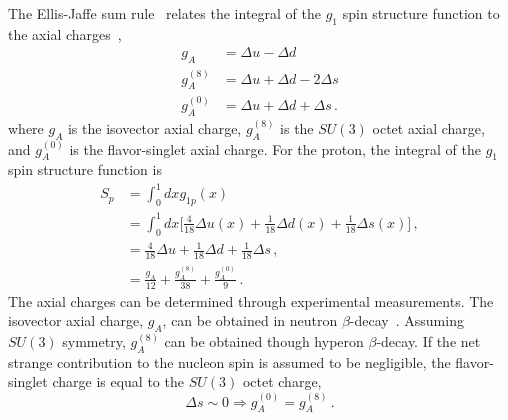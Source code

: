   The Ellis-Jaffe sum rule~\cite{Ellis:1973kp} relates the integral of the
  $g_1$ spin structure function to the axial charges~\cite{Thomas:2001kw},
  \begin{align*}
    g_A &= \Delta u - \Delta d \\
    g_A^{(8)} &= \Delta u + \Delta d - 2\Delta s \\
    g_A^{(0)} &= \Delta u + \Delta d + \Delta s \,.
  \end{align*}
  where $g_A$ is the isovector axial charge, $g_A^{(8)}$ is the $SU(3)$ octet
  axial charge, and $g_A^{(0)}$ is the flavor-singlet axial charge. For the
  proton, the integral of the $g_1$ spin structure function is
  \begin{align*}
    S_p &= \int_0^1 dx g_{1p}(x)  \\
        &= \int_0^1 dx \Big[\frac{4}{18}\Delta u(x) 
        + \frac{1}{18} \Delta d(x) + \frac{1}{18} \Delta s(x) \Big] \,, \\
        &= \frac{4}{18}\Delta u + \frac{1}{18}\Delta d + \frac{1}{18}\Delta s \,, \\
        &= \frac{g_A}{12} + \frac{g_A^{(8)}}{38} + \frac{g_A^{(0)}}{9} \,.
  \end{align*}
  The axial charges can be determined through experimental measurements.  The
  isovector axial charge, $g_A$, can be obtained in neutron
  $\beta$-decay~\cite{Dubbers:1991bh}. Assuming $SU(3)$ symmetry, $g_A^{(8)}$
  can be obtained though hyperon $\beta$-decay. If the net strange contribution
  to the nucleon spin is assumed to be negligible, the flavor-singlet charge is
  equal to the $SU(3)$ octet charge,
  \begin{equation*}
     \Delta s \sim 0 \Rightarrow g_A^{(0)} = g_A^{(8)} \,.
  \end{equation*}


